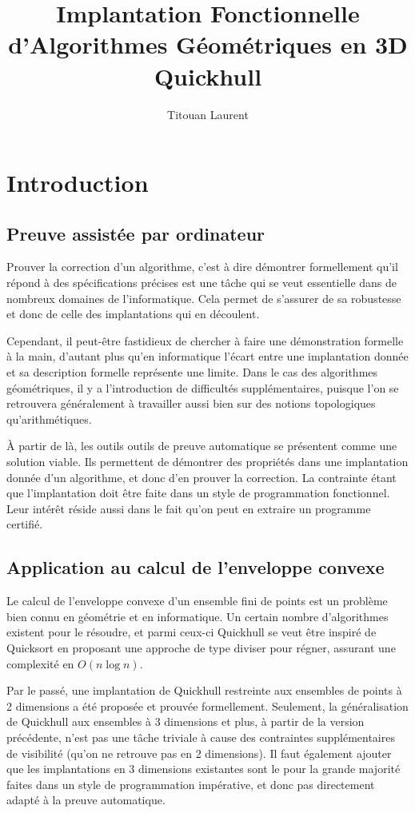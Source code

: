\documentclass[]{article}
\title{Implantation Fonctionnelle \\ d'Algorithmes Géométriques en 3D \\
  \large Quickhull}
\author{Titouan Laurent}
\date{}
\begin{document}
\maketitle

\section{Introduction}
\subsection*{Preuve assistée par ordinateur}
Prouver la correction d'un algorithme, c'est à dire démontrer formellement qu'il répond à des spécifications précises est une tâche qui se veut essentielle dans de nombreux domaines de l'informatique. Cela permet de s'assurer de sa robustesse et donc de celle des implantations qui en découlent.

Cependant, il peut-être fastidieux de chercher à faire une démonstration formelle à la main, d'autant plus qu'en informatique l'écart entre une implantation donnée et sa description formelle représente une limite. Dans le cas des algorithmes géométriques, il y a l'introduction de difficultés supplémentaires, puisque l'on se retrouvera généralement à travailler aussi bien sur des notions topologiques qu'arithmétiques.

À partir de là, les outils outils de preuve automatique se présentent comme une solution viable. Ils permettent de démontrer des propriétés dans une implantation donnée d'un algorithme, et donc d'en prouver la correction. La contrainte étant que l'implantation doit être faite dans un style de programmation fonctionnel. Leur intérêt réside aussi dans le fait qu'on peut en extraire un programme certifié.

\subsection*{Application au calcul de l'enveloppe convexe}
Le calcul de l'enveloppe convexe d'un ensemble fini de points est un problème bien connu en géométrie et en informatique. Un certain nombre d'algorithmes existent pour le résoudre, et parmi ceux-ci Quickhull se veut être inspiré de Quicksort en proposant une approche de type diviser pour régner, assurant une complexité en $O(n\log{}n)$.

Par le passé, une implantation de Quickhull restreinte aux ensembles de points à 2 dimensions a été proposée et prouvée formellement. Seulement, la généralisation de Quickhull aux ensembles à 3 dimensions et plus, à partir de la version précédente, n'est pas une tâche triviale à cause des contraintes supplémentaires de visibilité (qu'on ne retrouve pas en 2 dimensions). Il faut également ajouter que les implantations en 3 dimensions existantes sont le pour la grande majorité faites dans un style de programmation impérative, et donc pas directement adapté à la preuve automatique.
\end{document}
